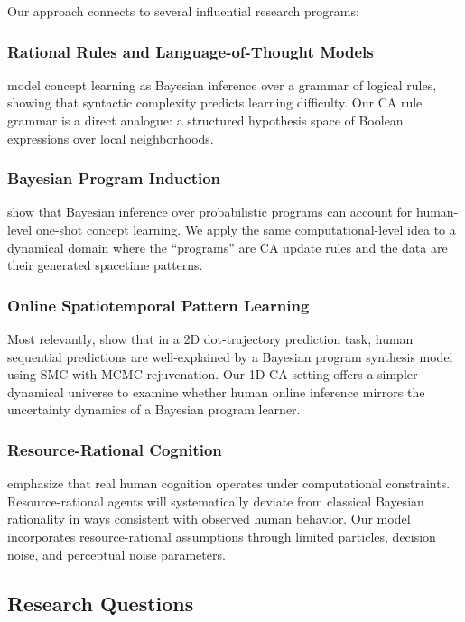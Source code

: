 \documentclass[10pt,letterpaper]{article}
\begin{document}
Our approach connects to several influential research programs:

\subsubsection{Rational Rules and Language-of-Thought Models}
 model concept learning as Bayesian inference over a grammar of logical rules, showing that syntactic complexity predicts learning difficulty. Our CA rule grammar is a direct analogue: a structured hypothesis space of Boolean expressions over local neighborhoods.

\subsubsection{Bayesian Program Induction}
 show that Bayesian inference over probabilistic programs can account for human-level one-shot concept learning. We apply the same computational-level idea to a dynamical domain where the ``programs'' are CA update rules and the data are their generated spacetime patterns.

\subsubsection{Online Spatiotemporal Pattern Learning}
Most relevantly,  show that in a 2D dot-trajectory prediction task, human sequential predictions are well-explained by a Bayesian program synthesis model using SMC with MCMC rejuvenation. Our 1D CA setting offers a simpler dynamical universe to examine whether human online inference mirrors the uncertainty dynamics of a Bayesian program learner.

\subsubsection{Resource-Rational Cognition}
 emphasize that real human cognition operates under computational constraints. Resource-rational agents will systematically deviate from classical Bayesian rationality in ways consistent with observed human behavior. Our model incorporates resource-rational assumptions through limited particles, decision noise, and perceptual noise parameters.

\subsection{Research Questions}
\end{document}
